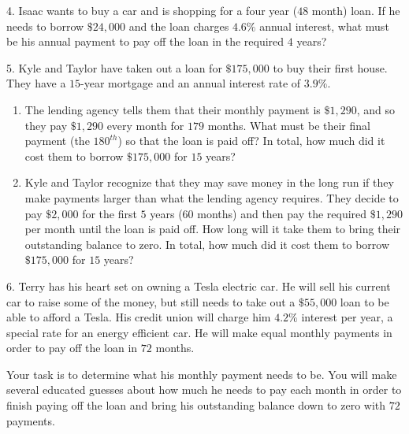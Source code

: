 \documentclass[10pt,]{book}
\theoremstyle{plain}
\theoremstyle{definition}
\theoremstyle{definition}
\theoremstyle{definition}
\numberwithin{equation}{section}
\begin{document}
\begin{exerciselist}
\par\smallskip
\item[4.]\hypertarget{exercise-15}{}\hypertarget{p-63}{}%
Isaac wants to buy a car and is shopping for a four year (\(48\) month) loan. If he needs to borrow \(\$24,000\) and the loan charges \(4.6\%\) annual interest, what must be his annual payment to pay off the loan in the required \(4\) years?%
\par\smallskip
\item[5.]\hypertarget{exercise-16}{}\hypertarget{p-64}{}%
Kyle and Taylor have taken out a loan for \(\$175,000\) to buy their first house. They have a \(15\)-year mortgage and an annual interest rate of \(3.9\%\). \leavevmode%
\begin{enumerate}[label=(\alph*)]
\item\hypertarget{li-52}{}The lending agency tells them that their monthly payment is \(\$1,290\), and so they pay \(\$1,290\) every month for \(179\) months. What must be their final payment (the \(180^{th}\)) so that the loan is paid off?  In total, how much did it cost them to borrow \(\$175,000\) for \(15\) years?%
\item\hypertarget{li-53}{}Kyle and Taylor recognize that they may save money in the long run if they make payments larger than what the lending agency requires. They decide to pay \(\$2,000\) for the first \(5\) years (\(60\) months) and then pay the required \(\$1,290\) per month until the loan is paid off. How long will it take them to bring their outstanding balance to zero. In total, how much did it cost them to borrow \(\$175,000\) for \(15\) years?%
\end{enumerate}
%
\par\smallskip
\item[6.]\hypertarget{exercise-17}{}\hypertarget{p-65}{}%
Terry has his heart set on owning a Tesla electric car. He will sell his current car to raise some of the money, but still needs to take out a \(\$55,000\) loan to be able to afford a Tesla. His credit union will charge him \(4.2\%\) interest per year, a special rate for an energy efficient car. He will make equal monthly payments in order to pay off the loan in \(72\) months.%
\par
\hypertarget{p-66}{}%
Your task is to determine what his monthly payment needs to be. You will make several educated guesses about how much he needs to pay each month in order to finish paying off the loan and bring his outstanding balance down to zero with \(72\) payments. \leavevmode%
\begin{enumerate}[label=(\alph*)]

\end{enumerate}
\end{exerciselist}
\end{document}
